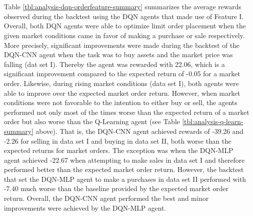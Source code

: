 \\
\\
Table \ref{tbl:analysis-dqn-orderfeature-summary} summarizes the average rewards observed during the backtest using the DQN agents that made use of Feature I.
Overall, both DQN agents were able to optimize limit order placement when the given market conditions came in favor of making a purchase or sale respectively.
More precisely, significant improvements were made during the backtest of the DQN-CNN agent when the task was to buy assets and the market price was falling (dat set I). 
Thereby the agent was rewarded with 22.06, which is a significant improvement compared to the expected return of -0.05 for a market order.
Likewise, during rising market conditions (data set I), both agents were able to improve over the expected market order return.
However, when market conditions were not favorable to the intention to either buy or sell, the agents performed not only most of the times worse than the expected return of a market order but also worse than the Q-Learning agent (see Table \ref{tbl:analysis-q-learn-summary} above).
That is, the DQN-CNN agent achieved rewards of -39.26 and -2.26 for selling in data set I and buying in data set II, both worse than the expected returns for market orders.
The exception was when the DQN-MLP agent achieved -22.67 when attempting to make sales in data set I and therefore performed better than the expected market order return.
However, the backtest that set the DQN-MLP agent to make a purchases in data set II performed with -7.40 much worse than the baseline provided by the expected market order return.
Overall, the DQN-CNN agent performed the best and minor improvements were achieved by the DQN-MLP agent.

